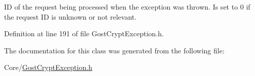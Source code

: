 ID of the request being processed when the exception was thrown. Is set to 0 if the request ID is unknown or not relevant. 

Definition at line 191 of file Gost\+Crypt\+Exception.\+h.



The documentation for this class was generated from the following file\+:\begin{DoxyCompactItemize}
\item 
Core/\hyperlink{_gost_crypt_exception_8h}{Gost\+Crypt\+Exception.\+h}\end{DoxyCompactItemize}
